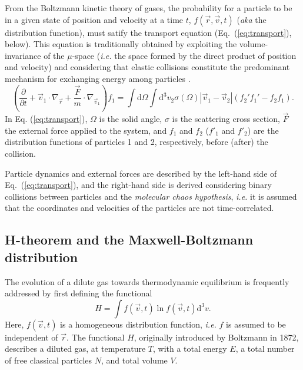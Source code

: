 From the Boltzmann kinetic theory of gases, the probability for a particle to be in a given
state of position and velocity at a time $t$,
$f(\vec r,\vec v,t)$ (\textit{aka} the distribution function), must satify
the transport equation (Eq.~(\ref{eq:transport}), below).
This equation is traditionally obtained by exploiting the volume-invariance of the $\mu$-space
(\textit{i.e.} the space formed by the direct product of position and velocity)
and considering that elastic collisions constitute the predominant mechanism
for exchanging energy among particles \cite{bib:huang}.
%
\begin{equation}\label{eq:transport}
  \left(
    \frac{\partial}{\partial t}+\vec{v}_1 \cdot\nabla_{\vec r}
    +\frac{\vec{F}}{m}\cdot\nabla_{\vec v_1}
  \right)f_1=\int\mathrm{d}\Omega\int
    \mathrm{d}^{3}v_2\sigma(\Omega)|\vec{v}_1-\vec{v}_2|(f_2'f_1'-f_2f_1).
\end{equation}
%
In Eq. (\ref{eq:transport}), $\Omega$ is the solid angle, $\sigma$ is the
scattering cross section, $\vec F$ the
external force applied to the system, and $f_1$ and $f_2$ ($f'_1$ and $f'_2$) are the distribution
functions of particles 1 and 2, respectively, before (after) the collision.

Particle dynamics and external forces are described
by the left-hand side of Eq.~(\ref{eq:transport}), and the right-hand side
is derived considering binary collisions between particles and
the \textit{molecular chaos hypothesis}, \textit{i.e.} it is assumed that
the coordinates and velocities of the particles are not time-correlated.


\subsection{H-theorem and the Maxwell-Boltzmann distribution}

The evolution of a dilute gas towards thermodynamic equilibrium is frequently
addressed by first defining the functional \cite{bib:tolman,bib:huang}
%
\begin{equation}\label{eq:hfunctional}
   H=\int f(\vec{v},t) \ln f(\vec{v},t) \mathrm{d}^{3}v.
\end{equation} 
%
Here, $f(\vec{v},t)$ is a homogeneous distribution function, \textit{i.e.}
$f$ is assumed to be independent of $\vec r$.
The functional $H$, originally introduced by Boltzmann in 1872,
describes a diluted gas, at temperature $T$, with a total energy $E$, a total
number of free classical particles $N$, and total volume $V$.

